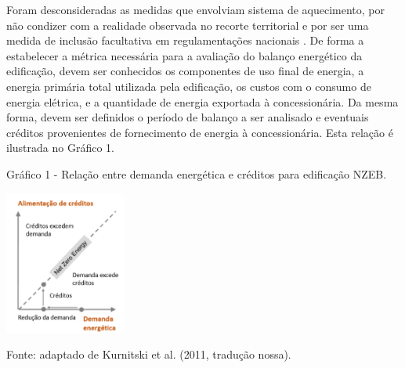 \noindent Foram desconsideradas as medidas que envolviam sistema de aquecimento, por não condizer com a realidade observada no recorte territorial e por ser uma medida de inclusão facultativa em regulamentações nacionais \cite{InstitutoNacionaldeMetrologiaNormalizacaoeQualidadeIndustrial-INMETRO2018,InstitutoNacionaldeMetrologiaNormalizacaoeQualidadeIndustrial-INMETRO2018a}. De forma a estabelecer a métrica necessária para a avaliação do balanço energético da edificação, devem ser conhecidos os componentes de uso final de energia, a energia primária total utilizada pela edificação, os custos com o consumo de energia elétrica, e a quantidade de energia exportada à concessionária. Da mesma forma, devem ser definidos o período de balanço a ser analisado e eventuais créditos provenientes de fornecimento de energia à concessionária. Esta relação é ilustrada no Gráfico 1.%

    \begin{graph}
        \par \small Gráfico 1 - Relação entre demanda energética e créditos para edificação NZEB.
        \begin{minipage}[ht]{1\textwidth}\centering
            \includegraphics[width=0.3\textwidth]{figures/esquema_iea_2014-2.png}            
        \end{minipage}
        \begin{flushleft}
            \par \small Fonte: adaptado de Kurnitski et al. (2011, tradução nossa).            
        \end{flushleft}
    \end{graph}
